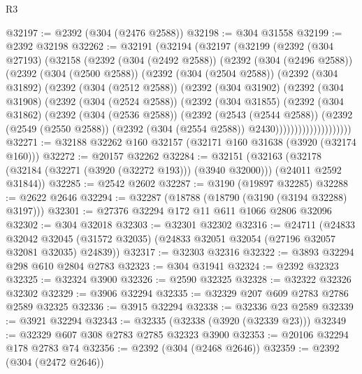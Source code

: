 \begin{lexlean}{R3}
\begin{coremodule}
@32197 := @2392 (@304 (@2476 @2588))
@32198 := @304 @31558
@32199 := @2392 @32198
@32262 := @32191
    (@32194
      (@32197
        (@32199
          (@2392
            (@304 @27193)
            (@32158
              (@2392
                (@304 (@2492 @2588))
                (@2392
                  (@304 (@2496 @2588))
                  (@2392
                    (@304 (@2500 @2588))
                    (@2392
                      (@304 (@2504 @2588))
                      (@2392
                        (@304 @31892)
                        (@2392
                          (@304 (@2512 @2588))
                          (@2392
                            (@304 @31902)
                            (@2392
                              (@304 @31908)
                              (@2392
                                (@304 (@2524 @2588))
                                (@2392
                                  (@304 @31855)
                                  (@2392
                                    (@304 @31862)
                                    (@2392
                                      (@304 (@2536 @2588))
                                      (@2392
                                        (@2543 (@2544 @2588))
                                        (@2392
                                          (@2549 (@2550 @2588))
                                          (@2392 (@304 (@2554 @2588)) @2430))))))))))))))))))))
@32271 := @32188 @32262 @160 @32157 (@32171 @160 @31638 (@3920 (@32174 @160)))
@32272 := @20157 @32262
@32284 := @32151
    (@32163 (@32178 (@32184 (@32271 (@3920 (@32272 @193))) (@3940 @32000))) (@24011 @2592 @31844))
@32285 := @2542 @2602
@32287 := @3190 (@19897 @32285)
@32288 := @2622 @2646
@32294 := @32287 (@18788 (@18790 (@3190 (@3194 @32288) @3197)))
@32301 := @27376 @32294 @172 @11 @611 @1066 @2806 @32096
@32302 := @304 @32018
@32303 := @32301 @32302
@32316 := @24711
    (@24833
      @32042
      @32045
      (@31572 @32035)
      (@24833 @32051 @32054 (@27196 @32057 @32081 @32035) @24839))
@32317 := @32303 @32316
@32322 := @3893 @32294 @298 @610 @2804 @2783
@32323 := @304 @31941
@32324 := @2392 @32323
@32325 := @32324 @3900
@32326 := @2590 @32325
@32328 := @32322 @32326 @32302
@32329 := @3906 @32294
@32335 := @32329 @207 @609 @2783 @2786 @2589 @32325
@32336 := @3915 @32294
@32338 := @32336 @23 @2589
@32339 := @3921 @32294
@32343 := @32335 (@32338 (@3920 (@32339 @23)))
@32349 := @32329 @607 @308 @2783 @2785 @32323 @3900
@32353 := @20106 @32294 @178 @2783 @74
@32356 := @2392 (@304 (@2468 @2646))
@32359 := @2392 (@304 (@2472 @2646))

\end{coremodule}
\end{lexlean}
